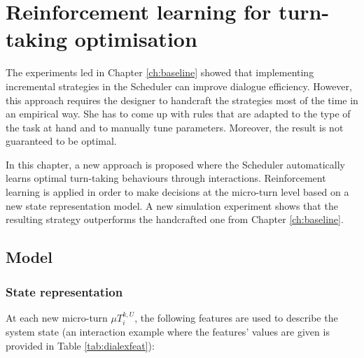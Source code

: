 \chapter{Reinforcement learning for turn-taking optimisation}
\label{ch:rl}

	The experiments led in Chapter \ref{ch:baseline} showed that implementing incremental strategies in the Scheduler can improve dialogue efficiency. However, this approach requires the designer to handcraft the strategies most of the time in an empirical way. She has to come up with rules that are adapted to the type of the task at hand and to manually tune parameters. Moreover, the result is not guaranteed to be optimal.
	
	In this chapter, a new approach is proposed where the Scheduler automatically learns optimal turn-taking behaviours through interactions. Reinforcement learning is applied in order to make decisions at the micro-turn level based on a new state representation model. A new simulation experiment shows that the resulting strategy outperforms the handcrafted one from Chapter \ref{ch:baseline}.

\section{Model}

	\subsection{State representation}
    
    	At each new micro-turn $\mu T^{k,U}_i$, the following features are used to describe the system state (an interaction example where the features' values are given is provided in Table \ref{tab:dialexfeat}):
        
